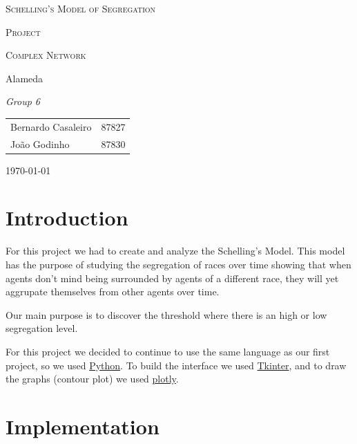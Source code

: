 \documentclass[a4paper,titlepage,11pt]{article}
\begin{document}
\begin{titlepage}
  \begin{center}
    {\scshape \huge Schelling's Model of Segregation \par}
    \vspace{1cm}

    {\scshape \LARGE Project \par}
    \vspace{1.5cm}

    {\scshape \Large Complex Network \par}
    \vspace{0.5cm}

    {\Large Alameda \par}
    \vfill

    {\itshape \Large Group 6 \par}
    \vfill

    \begin{tabular}{l l}
      Bernardo Casaleiro & 87827\\
      João Godinho & 87830\\
    \end{tabular}
    \vfill

    {\large \today\par}
  \end{center}
\end{titlepage}

\section{Introduction}
For this project we had to create and analyze the Schelling's Model. This model has the purpose of studying the segregation of races over time showing that when agents don't mind being surrounded by agents of a different race, they will yet aggrupate themselves from other agents over time.

Our main purpose is to discover the threshold where there is an high or low segregation level.

For this project we decided to continue to use the same language as our first project, so we used \href{https://www.python.org}{Python}. To build the interface we used \href{https://wiki.python.org/moin/TkInter}{Tkinter}, and to draw the graphs (contour plot) we used \href{https://plot.ly/}{plotly}.

\section{Implementation}
\end{document}
